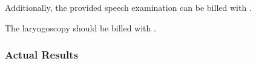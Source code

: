 Additionally, the provided speech examination can be billed with .

The laryngoscopy should be billed with .

\subsubsection{Actual Results}



